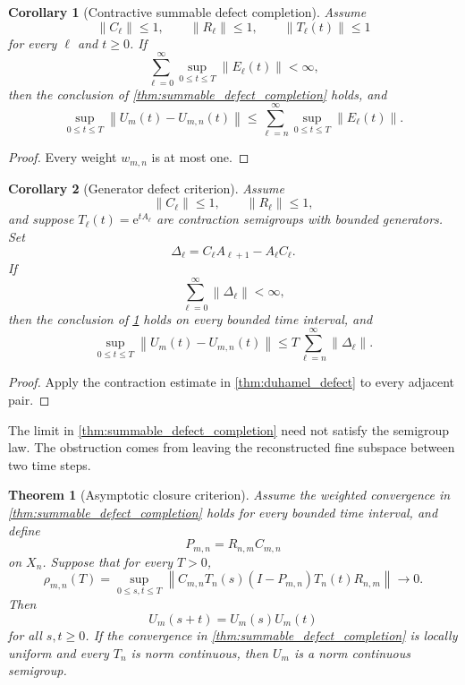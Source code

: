 \documentclass{aomart}
\newtheorem{theorem}{Theorem}[section]
\newtheorem{corollary}[corollary]{Corollary}
\theoremstyle{definition}
\theoremstyle{remark}
\newcommand{\e}{\mathrm e}
\newcommand{\norm}[1]{\left\lVert#1\right\rVert}
\begin{document}
\begin{corollary}[Contractive summable defect completion]\label{cor:contractive_defect_completion}
Assume
\[
\norm{C_\ell}\leq1,
\qquad
\norm{R_\ell}\leq1,
\qquad
\norm{T_\ell(t)}\leq1
\]
for every \(\ell\) and \(t\geq0\). If
\[
\sum_{\ell=0}^{\infty}
\sup_{0\leq t\leq T}\norm{E_\ell(t)}<\infty,
\]
then the conclusion of \cref{thm:summable_defect_completion} holds, and
\[
\sup_{0\leq t\leq T}
\norm{U_m(t)-U_{m,n}(t)}
\leq
\sum_{\ell=n}^{\infty}
\sup_{0\leq t\leq T}\norm{E_\ell(t)}.
\]
\end{corollary}

\begin{proof}
Every weight \(w_{m,n}\) is at most one.
\end{proof}

\begin{corollary}[Generator defect criterion]\label{cor:generator_defect_completion}
Assume
\[
\norm{C_\ell}\leq1,
\qquad
\norm{R_\ell}\leq1,
\]
and suppose \(T_\ell(t)=\e^{tA_\ell}\) are contraction semigroups with bounded generators. Set
\[
\Delta_\ell=C_\ell A_{\ell+1}-A_\ell C_\ell.
\]
If
\[
\sum_{\ell=0}^{\infty}\norm{\Delta_\ell}<\infty,
\]
then the conclusion of \cref{cor:contractive_defect_completion} holds on every bounded time interval, and
\[
\sup_{0\leq t\leq T}
\norm{U_m(t)-U_{m,n}(t)}
\leq
T\sum_{\ell=n}^{\infty}\norm{\Delta_\ell}.
\]
\end{corollary}

\begin{proof}
Apply the contraction estimate in \cref{thm:duhamel_defect} to every adjacent pair.
\end{proof}

The limit in \cref{thm:summable_defect_completion} need not satisfy the semigroup law. The obstruction comes from leaving the reconstructed fine subspace between two time steps.

\begin{theorem}[Asymptotic closure criterion]\label{thm:asymptotic_closure}
Assume the weighted convergence in \cref{thm:summable_defect_completion} holds for every bounded time interval, and define
\[
P_{m,n}=R_{n,m}C_{m,n}
\]
on \(X_n\). Suppose that for every \(T>0\),
\[
\rho_{m,n}(T)
=
\sup_{0\leq s,t\leq T}
\norm{
C_{m,n}T_n(s)(I-P_{m,n})T_n(t)R_{n,m}
}
\longrightarrow0.
\]
Then
\[
U_m(s+t)=U_m(s)U_m(t)
\]
for all \(s,t\geq0\). If the convergence in \cref{thm:summable_defect_completion} is locally uniform and every \(T_n\) is norm continuous, then \(U_m\) is a norm continuous semigroup.
\end{theorem}
\end{document}
